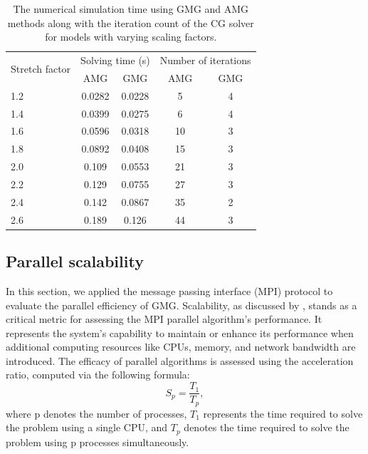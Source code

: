 \documentclass[extra, referee]{gji}
\begin{document}
\begin{table}
    \centering
    \caption{The numerical simulation time using GMG and AMG methods along with
      the iteration count of the CG solver for models with varying scaling
      factors.}
    \begin{tabular}{lcccc}
    \toprule
    \multirow{2}{*}{Stretch factor} & \multicolumn{2}{c}{Solving time (s)} &
    \multicolumn{2}{c}{Number of iterations} \\ \cmidrule(lr){2-3}
    \cmidrule(lr){4-5} & AMG & GMG & AMG & GMG \\ \midrule 1.2 & 0.0282 & 0.0228
    & 5 & 4 \\
    1.4 & 0.0399 & 0.0275 & 6 & 4 \\
    1.6 & 0.0596 & 0.0318 & 10 & 3 \\
    1.8 & 0.0892 & 0.0408 & 15 & 3 \\
    2.0 & 0.109 & 0.0553 & 21 & 3 \\
    2.2 & 0.129 & 0.0755 & 27 & 3 \\
    2.4 & 0.142 & 0.0867 & 35 & 2 \\
    2.6 & 0.189 & 0.126 & 44 & 3 \\  \bottomrule
    \end{tabular}
    \label{table:stretch}
\end{table}


\subsection{Parallel scalability}

In this section, we applied the message passing interface (MPI) protocol to
evaluate the parallel efficiency of GMG. Scalability, as discussed by
\citep{Buntinas2008}, stands as a critical metric for assessing the MPI parallel
algorithm's performance. It represents the system's capability to maintain or
enhance its performance when additional computing resources like CPUs, memory,
and network bandwidth are introduced. The efficacy of parallel algorithms is
assessed using the acceleration ratio, computed via the following formula:
\begin{equation}
   {S}_{p}= \frac{{T}_{1}}{{T}_{p}},
\end{equation}
where p denotes the number of processes, ${T}_{1}$ represents the time required
to solve the problem using a single CPU, and ${T}_{p}$ denotes the time required
to solve the problem using p processes simultaneously.
\end{document}
